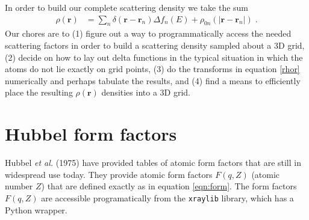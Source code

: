\documentclass[11pt]{article}
\renewcommand{\vec}[1]{\boldsymbol{#1}}
\begin{document}
In order to build our complete scattering density we take the sum
\begin{align}
\rho(\vec{r})  &= \sum_n \delta(\vec{r}-\vec{r}_n) \Delta f_n(E) + \rho_{0n}(|\vec{r}-\vec{r}_n|) \; .
\end{align}
Our chores are to (1) figure out a way to programmatically access the needed scattering factors in order to build a scattering density sampled about a 3D grid, (2) decide on how to lay out delta functions in the typical situation in which the atoms do not lie exactly on grid points, (3) do the transforms in equation \ref{rhor} numerically and perhaps tabulate the results, and (4) find a means to efficiently place the resulting $\rho(\vec{r})$ densities into a 3D grid.



\section{Hubbel form factors}

Hubbel {\itshape et al.} (1975)\cite{hubbellAtomicFormFactors1975} have provided tables of atomic form factors that are still in widespread use today.  They provide atomic form factors $F(q,Z)$ (atomic number $Z$) that are defined exactly as in equation \ref{eqn:form}.
The form factors $F(q,Z)$ are accessible programatically from the  \texttt{xraylib} library, which has a Python wrapper.
\end{document}
